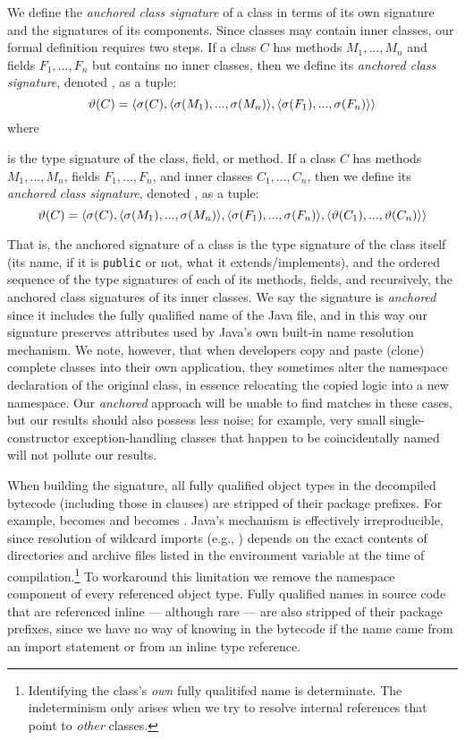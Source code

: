 We define the \emph{anchored class signature} of a class in terms of its
own signature and the signatures of its components.  Since classes may
contain inner classes, our formal definition requires two steps.  
If a class $C$ has methods $M_1, ... , M_n$ and fields $F_1, ... , F_n$ but
contains no inner classes, then  we define its \emph{anchored class
signature}, denoted , as a tuple: 
\[ 
\vartheta(C) =
\langle \sigma(C), 
    \langle \sigma(M_1), ... , \sigma(M_n) \rangle, 
    \langle \sigma(F_1), ... , \sigma(F_n) \rangle
\rangle \]
\noindent
where \signature{a} is the type signature of the class, field,  or method.  
If a class $C$ has methods $M_1, ... , M_n$, fields $F_1, ... , F_n$, and
inner classes $C_1, ... , C_n$, then  we define its \emph{anchored class
signature}, denoted , as a tuple: 
\[ 
\vartheta(C) =
\langle \sigma(C), 
    \langle \sigma(M_1), ... , \sigma(M_n) \rangle, 
    \langle \sigma(F_1), ... , \sigma(F_n) \rangle, 
    \langle \vartheta(C_1), ... , \vartheta(C_n) \rangle 
\rangle \]

\noindent
That is, the anchored signature of a class is the type signature of the
class itself (its name, if it is \texttt{public} or not, what it
extends/implements), and the ordered sequence of the type signatures of
each of its methods, fields, and recursively, the anchored class signatures
of its inner classes.  We say the signature is \emph{anchored} since it
includes the fully qualified name of the Java file, and in this way our
signature preserves attributes used by Java's own built-in name resolution
mechanism.  We note, however, that when
developers copy and paste (clone) complete classes into their own
application, they sometimes alter the namespace declaration of the original
class, in essence relocating the copied logic into a new namespace.  Our
\emph{anchored} approach will be unable to find matches in these cases, but
our results should also possess less noise; for example, very small
single-constructor exception-handling classes that happen to be
coincidentally named will not pollute our results.

When building the signature, all fully qualified
object types in the decompiled bytecode
(including those in  clauses)
are stripped of their package prefixes.
For example,  becomes 
and  becomes .
Java's  mechanism is effectively
irreproducible, since resolution of wildcard imports
(e.g., )
depends on the exact contents of
directories and archive files listed in the
 environment variable at the time of
compilation.\footnote{Identifying
%
the class's \emph{own} fully qualitifed name is determinate.
The indeterminism only arises when we try to resolve internal
references that point to \emph{other} classes.}
%
To workaround this limitation we remove the namespace
component of every referenced object type.
Fully qualified names in source code
that are referenced inline --- although rare --- are also
stripped of their package prefixes, since we have no way
of knowing in the bytecode if the name came from an import
statement or from an inline type reference.

